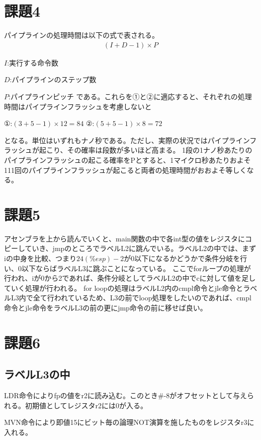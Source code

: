 \documentclass{jsarticle}
\begin{document}
\newpage

\section{課題4}
パイプラインの処理時間は以下の式で表される。
\begin{eqnarray}
    (I + D - 1) \times P \nonumber
\end{eqnarray}

$I$:実行する命令数

$D$:パイプラインのステップ数

$P$:パイプラインピッチ
である。これらを①と②に適応すると、それぞれの処理時間はパイプラインフラッシュを考慮しないと

①:$(3 + 5 - 1) \times 12 = 84$
②:$(5 + 5 - 1) \times 8 = 72$

となる。単位はいずれもナノ秒である。ただし、実際の状況ではパイプラインフラッシュが起こり、その確率は段数が多いほど高まる。
1段の1ナノ秒あたりのパイプラインフラッシュの起こる確率をPとすると、1マイクロ秒あたりおよそ111回のパイプラインフラッシュが起こると両者の処理時間がおおよそ等しくなる。

\section{課題5}
アセンブラを上から読んでいくと、main関数の中で各int型の値をレジスタにコピーしていき、jmpのところでラベルL2に跳んでいる。ラベルL2の中では、まずiの中身を比較、つまり$24(\%esp)-2$が0以下になるかどうかで条件分岐を行い、0以下ならばラベルL3に跳ぶことになっている。
ここでforループの処理が行われ、iが0から2であれば、条件分岐としてラベルL2の中でcに対して値を足していく処理が行われる。
for loopの処理はラベルL2内のcmpl命令とjle命令とラベルL3内で全て行われているため、L3の前でloop処理をしたいのであれば、cmpl命令とjle命令をラベルL3の前の更にjmp命令の前に移せば良い。

\section{課題6}

\subsection{ラベルL3の中}

LDR命令によりfpの値をr2に読み込む。このとき\#-8がオフセットとして与えられる。初期値としてレジスタr2には0が入る。

MVN命令により即値15にビット毎の論理NOT演算を施したものをレジスタr3に入れる。
\end{document}
